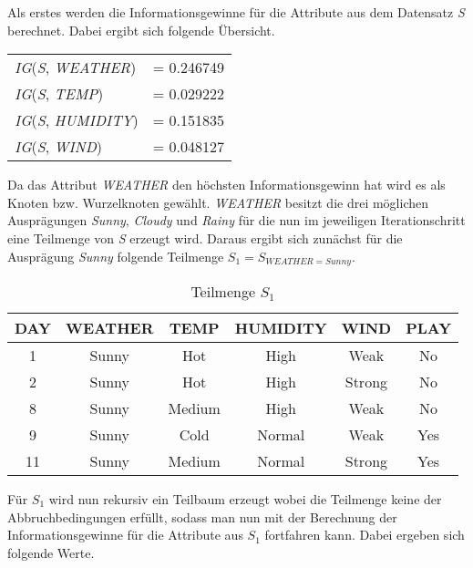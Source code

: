 Als erstes werden die Informationsgewinne für die Attribute aus dem Datensatz \textit{S} berechnet. Dabei ergibt sich folgende Übersicht.

\begin{table}[htbp]
    \centering
    \begin{tabular}{lc}
        \textit{IG}(\textit{S}, \textit{WEATHER})  &= 0.246749 \\
        \textit{IG}(\textit{S}, \textit{TEMP})     &= 0.029222 \\
        \textit{IG}(\textit{S}, \textit{HUMIDITY}) &= 0.151835 \\
        \textit{IG}(\textit{S}, \textit{WIND})     &= 0.048127 \\
    \end{tabular}
\end{table}

Da das Attribut \textit{WEATHER} den höchsten Informationsgewinn hat wird es als Knoten bzw. Wurzelknoten gewählt. \textit{WEATHER} besitzt die drei möglichen Ausprägungen \textit{Sunny}, \textit{Cloudy} und \textit{Rainy} für die nun im jeweiligen Iterationschritt eine Teilmenge von \textit{S} erzeugt wird. Daraus ergibt sich zunächst für die Ausprägung \textit{Sunny} folgende Teilmenge $S_{1} = S_{WEATHER=Sunny}$.

\begin{table}[H]
    \centering
    \begin{tabular}{cccccc}
        \toprule
        \textbf{DAY} & \textbf{WEATHER} & \textbf{TEMP} & \textbf{HUMIDITY} & \textbf{WIND} & \textbf{PLAY} \\
        \toprule
        1   &Sunny	&Hot	&High	&Weak	&No  \\
        2   &Sunny	&Hot	&High	&Strong	&No  \\
        8   &Sunny	&Medium	&High	&Weak	&No  \\
        9   &Sunny	&Cold	&Normal	&Weak	&Yes \\
        11  &Sunny	&Medium	&Normal	&Strong	&Yes \\
        \bottomrule
    \end{tabular}
    \caption{Teilmenge $S_{1}$}
    \label{table:datensatz-sunny}
\end{table}

Für $S_{1}$ wird nun rekursiv ein Teilbaum erzeugt wobei die Teilmenge keine der Abbruchbedingungen erfüllt, sodass man nun mit der Berechnung der Informationsgewinne für die Attribute aus $S_{1}$ fortfahren kann. Dabei ergeben sich folgende Werte.

